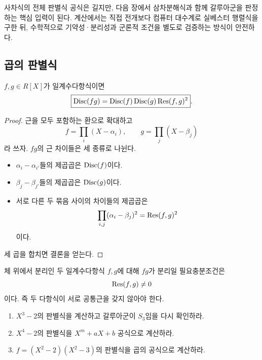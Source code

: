\begin{remark}
사차식의 전체 판별식 공식은 길지만, 다음 장에서 삼차분해식과 함께 갈루아군을 판정하는 핵심 입력이 된다. 계산에서는 직접 전개보다 컴퓨터 대수계로 실베스터 행렬식을 구한 뒤, 수학적으로 기약성·분리성과 군론적 조건을 별도로 검증하는 방식이 안전하다.
\end{remark}

\subsection{곱의 판별식}

\begin{theorem}[곱의 판별식 공식]
\label{thm:discriminant-product}
$f,g\in R[X]$가 일계수다항식이면
\[
  \boxed{
  \operatorname{Disc}(fg)
  =\operatorname{Disc}(f)\operatorname{Disc}(g)\operatorname{Res}(f,g)^2
  }.
\]
\end{theorem}

\begin{proof}
근을 모두 포함하는 환으로 확대하고
\[
  f=\prod_i(X-\alpha_i),
  \qquad
  g=\prod_j(X-\beta_j)
\]
라 쓰자. $fg$의 근 차이들은 세 종류로 나뉜다.
\begin{itemize}
  \item $\alpha_i-\alpha_{i'}$들의 제곱곱은 $\operatorname{Disc}(f)$이다.
  \item $\beta_j-\beta_{j'}$들의 제곱곱은 $\operatorname{Disc}(g)$이다.
  \item 서로 다른 두 묶음 사이의 차이들의 제곱곱은
  \[
    \prod_{i,j}(\alpha_i-\beta_j)^2
    =\operatorname{Res}(f,g)^2
  \]
  이다.
\end{itemize}
세 곱을 합치면 결론을 얻는다.
\end{proof}

\begin{corollary}
체 위에서 분리인 두 일계수다항식 $f,g$에 대해 $fg$가 분리일 필요충분조건은
\[
  \operatorname{Res}(f,g)\ne0
\]
이다. 즉 두 다항식이 서로 공통근을 갖지 않아야 한다.
\end{corollary}

\begin{checkpoint}
\begin{enumerate}[label=(\alph*)]
  \item $X^3-2$의 판별식을 계산하고 갈루아군이 $S_3$임을 다시 확인하라.
  \item $X^4-2$의 판별식을 $X^m+aX+b$ 공식으로 계산하라.
  \item $f=(X^2-2)(X^2-3)$의 판별식을 곱의 공식으로 계산하라.
\end{enumerate}
\end{checkpoint}
